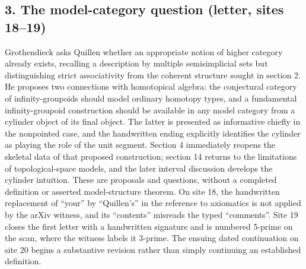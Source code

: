 \subsection*{3. The model-category question (letter, sites 18--19)}
Grothendieck asks Quillen whether an appropriate notion of higher category already exists, recalling a description by multiple semisimplicial sets but distinguishing strict associativity from the coherent structure sought in section 2. He proposes two connections with homotopical algebra: the conjectural category of infinity-groupoids should model ordinary homotopy types, and a fundamental infinity-groupoid construction should be available in any model category from a cylinder object of its final object. The latter is presented as informative chiefly in the nonpointed case, and the handwritten ending explicitly identifies the cylinder as playing the role of the unit segment. Section 4 immediately reopens the skeletal data of that proposed construction; section 14 returns to the limitations of topological-space models, and the later interval discussion develops the cylinder intuition. These are proposals and questions, without a completed definition or asserted model-structure theorem. On site 18, the handwritten replacement of ``your'' by ``Quillen's'' in the reference to axiomatics is not applied by the arXiv witness, and its ``contents'' misreads the typed ``comments''. Site 19 closes the first letter with a handwritten signature and is numbered 5-prime on the scan, where the witness labels it 3-prime. The ensuing dated continuation on site 20 begins a substantive revision rather than simply continuing an established definition.

